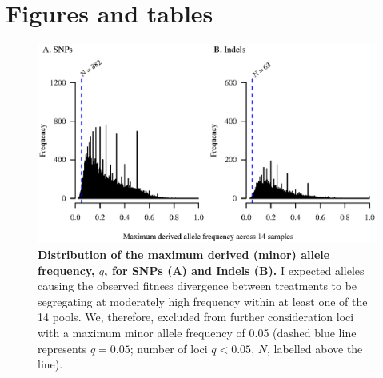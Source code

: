 \FloatBarrier
\newpage
\section{Figures and tables}
\begin{figure}[!h]
    \centering
    \includegraphics[width=1\textwidth]{Chp4_DNA/MAF_22.eps}
\caption[Distribution of the maximum derived (minor) allele frequency, $q$, for SNPs (A) and Indels (B).]{\textbf{Distribution of the maximum derived (minor) allele frequency, $q$, for SNPs (A) and Indels (B).} I expected alleles causing the observed fitness divergence between treatments to be segregating at moderately high frequency within at least one of the 14 pools. We, therefore, excluded from further consideration loci with a maximum minor allele frequency of 0.05 (dashed blue line represents $q = 0.05$; number of loci $q < 0.05$, $N$, labelled above the line). }
    \label{fig:FitmxMAF}
\end{figure}

\FloatBarrier

